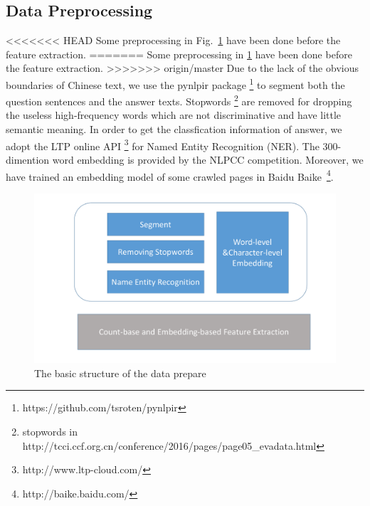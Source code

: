 \documentclass{llncs}
\begin{document}
\begin{table}[!htbp]
\begin{table}[!htbp]
\subsection{Data Preprocessing}
\label{sec:preprocess}
<<<<<<< HEAD
Some preprocessing in Fig.~\ref{fig:structure} have been done before the feature extraction. 
=======
Some preprocessing in \ref{fig:structure} have been done before the feature extraction. 
>>>>>>> origin/master
Due to the lack of the obvious boundaries of Chinese text, we use the pynlpir package \footnote{https://github.com/tsroten/pynlpir} \cite{Liu2010Language} to segment both the question sentences and the answer texts. Stopwords \footnote{stopwords in http://tcci.ccf.org.cn/conference/2016/pages/page05\_evadata.html} are removed for dropping the useless high-frequency words which are not discriminative and have little semantic meaning. In order to get the classfication information of answer, we adopt the LTP online API \footnote{http://www.ltp-cloud.com/} for Named Entity Recognition (NER). The 300-dimention word embedding is provided by the NLPCC competition. Moreover, we have trained an embedding model of some crawled pages in Baidu Baike~\footnote{http://baike.baidu.com/}. 
\begin{figure}
\centering
\includegraphics[width=12cm]{figures/structure.pdf}
\caption{The basic structure of the data prepare}
\label{fig:structure}
\end{figure}




\end{table}
\end{table}
\end{document}
